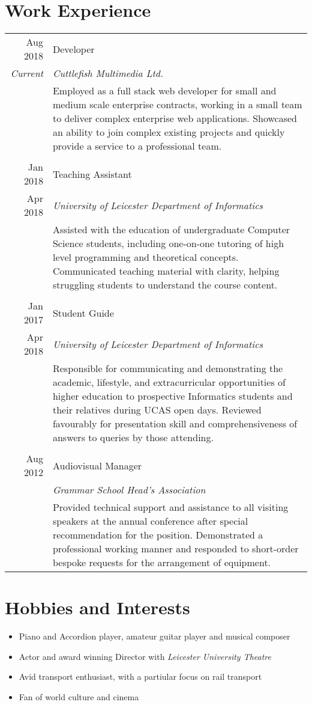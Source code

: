 \documentclass[a4paper]{article}
\begin{document}
\section*{Work Experience}
\begin{tabular}{r|p{11.75cm}}
  Aug 2018 & Developer \\
  \emph{Current} & \emph{Cuttlefish Multimedia Ltd.} \\
  & Employed as a full stack web developer for small and medium scale enterprise contracts, working in a small team to deliver complex enterprise web applications. Showcased an ability to join complex existing projects and quickly provide a service to a professional team. \\
  \multicolumn{2}{c}{} \\
  
  Jan 2018 & Teaching Assistant \\
  Apr 2018 & \emph{University of Leicester Department of Informatics} \\
  & Assisted with the education of undergraduate Computer Science students, including one-on-one tutoring of high level programming and theoretical concepts. Communicated teaching material with clarity, helping struggling students to understand the course content. \\
  \multicolumn{2}{c}{} \\
  
  Jan 2017 & Student Guide \\
  Apr 2018 & \emph{University of Leicester Department of Informatics} \\
  & Responsible for communicating and demonstrating the academic, lifestyle, and extracurricular opportunities of higher education to prospective Informatics students and their relatives during UCAS open days. Reviewed favourably for presentation skill and comprehensiveness of answers to queries by those attending. \\
  \multicolumn{2}{c}{} \\

  Aug 2012 & Audiovisual Manager \\
  & \emph{Grammar School Head's Association} \\
  & Provided technical support and assistance to all visiting speakers at the annual conference after special recommendation for the position. Demonstrated a professional working manner and responded to short-order bespoke requests for the arrangement of equipment.
\end{tabular}

\section*{Hobbies and Interests}
\begin{itemize}
\item Piano and Accordion player, amateur guitar player and musical composer
\item Actor and award winning Director with \emph{Leicester University Theatre}
\item Avid transport enthusiast, with a partiular focus on rail transport
\item Fan of world culture and cinema
\end{itemize}
\end{document}
